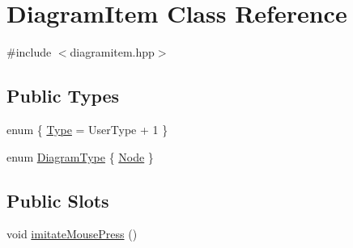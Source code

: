 \hypertarget{class_diagram_item}{
\section{DiagramItem Class Reference}
\label{class_diagram_item}
}


{\ttfamily \#include $<$diagramitem.hpp$>$}

\subsection*{Public Types}
\begin{DoxyCompactItemize}
\item 
enum \{ \hyperlink{class_diagram_item_a7089372ea2f1de7d55fe38db017214dfa87b5f8f28bda1b1f78244c68b603a570}{Type} =  UserType + 1
 \}
\item 
enum \hyperlink{class_diagram_item_aeda67bf28fac9b4de77086c2bf81407b}{DiagramType} \{ \hyperlink{class_diagram_item_aeda67bf28fac9b4de77086c2bf81407bae10be613f591534dd855318b9aff20fe}{Node}
 \}
\end{DoxyCompactItemize}
\subsection*{Public Slots}
\begin{DoxyCompactItemize}
\item 
void \hyperlink{class_diagram_item_aa58bd925ee097a98983f465bef15ea88}{imitateMousePress} ()
\end{DoxyCompactItemize}
